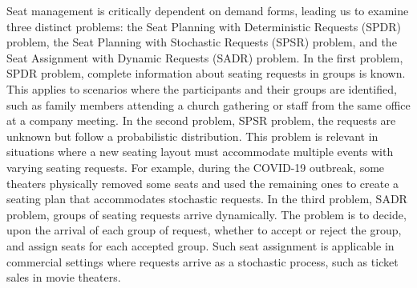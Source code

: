 Seat management is critically dependent on demand forms, leading us to examine three distinct problems:
the Seat Planning with Deterministic Requests (SPDR) problem, the Seat Planning with Stochastic Requests (SPSR) problem, and the Seat Assignment with Dynamic Requests (SADR) problem. In the first problem, SPDR problem, complete information about seating requests in groups is known. This applies to scenarios where the participants and their groups are identified, such as family members attending a church gathering or staff from the same office at a company meeting. In the second problem, SPSR problem, the requests are unknown but follow a probabilistic distribution. This problem is relevant in situations where a new seating layout must accommodate multiple events with varying seating requests. For example, during the COVID-19 outbreak, some theaters physically removed some seats and used the remaining ones to create a seating plan that accommodates stochastic requests. In the third problem, SADR problem, groups of seating requests arrive dynamically. The problem is to decide, upon the arrival of each group of request, whether to accept or reject the group, and assign seats for each accepted group. Such seat assignment is applicable in commercial settings where requests arrive as a stochastic process, such as ticket sales in movie theaters.



 

